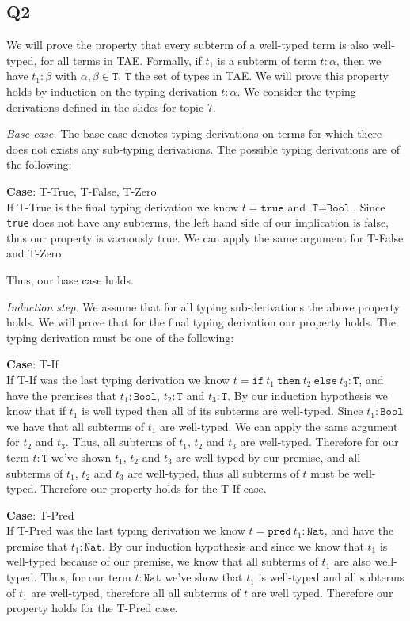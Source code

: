 \documentclass[12pt, fleqn]{article}
\begin{document}
\subsection{Q2}

We will prove the property that every subterm of a well-typed term is also well-typed, for all
terms in TAE. Formally, if $t_1$ is a subterm of term $t : \alpha$, then we have $t_1 : \beta$ with
$\alpha, \beta \in \texttt{T}$, $\texttt{T}$ the set of types in TAE.
We will prove this property holds by induction on the typing derivation $t : \alpha$. We consider the typing
derivations defined in the slides for topic 7.

\medskip
\emph{Base case.} The base case denotes typing derivations on terms for which there does not exists any sub-typing
derivations. The possible typing derivations are of the following:

\medskip
\textbf{Case}: T-True, T-False, T-Zero\\
If T-True is the final typing derivation we know $t = \texttt{true}$ and $\texttt{T} = \texttt{Bool}$. Since
\verb|true| does not have any subterms, the left hand side of our implication is false, thus our property is
vacuously true. We can apply the same argument for T-False and T-Zero.

Thus, our base case holds.

\medskip
\emph{Induction step.} We assume that for all typing sub-derivations the above property holds.
We will prove that for the final typing derivation our property holds. The typing derivation must be one of the
following:

\medskip
\textbf{Case}: T-If\\
If T-If was the last typing derivation we know $t = \texttt{if}\:t_1\:\texttt{then}\:t_2\:\texttt{else}\:t_3 : \texttt{T}$,
and have the premises that $t_1 : \texttt{Bool}$, $t_2 : \texttt{T}$ and $t_3 : \texttt{T}$. By our induction hypothesis we know
that if $t_1$ is well typed then all of its subterms are well-typed. Since $t_1 : \texttt{Bool}$ we have that all subterms of $t_1$
are well-typed. We can apply the same argument for $t_2$ and $t_3$. Thus, all subterms of $t_1$, $t_2$ and $t_3$ are well-typed.
Therefore for our term $t : \texttt{T}$ we've shown $t_1$, $t_2$ and $t_3$ are well-typed by our premise, and all subterms of $t_1$, $t_2$
and $t_3$ are well-typed, thus all subterms of $t$ must be well-typed. 
Therefore our property holds for the T-If case. 

\medskip
\textbf{Case}: T-Pred\\
If T-Pred was the last typing derivation we know $t = \texttt{pred}~t_1 : \texttt{Nat}$, and have the premise
that $t_1 : \texttt{Nat}$. By our induction hypothesis and since we know that $t_1$ is well-typed because of our premise,
we know that all subterms of $t_1$ are also well-typed. Thus, for our term $t : \texttt{Nat}$ we've show that
$t_1$ is well-typed and all subterms of $t_1$ are well-typed, therefore all all subterms of $t$ are well typed.
Therefore our property holds for the T-Pred case.
\end{document}
